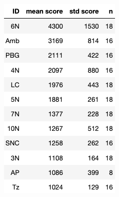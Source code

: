 \documentclass[runningheads]{llncs}
\begin{document}
\begin{figure}[t]
  \includegraphics[width=\textwidth]{figures/ScoresOfStructures.png}
  \caption{}
\end{figure}
\end{document}
